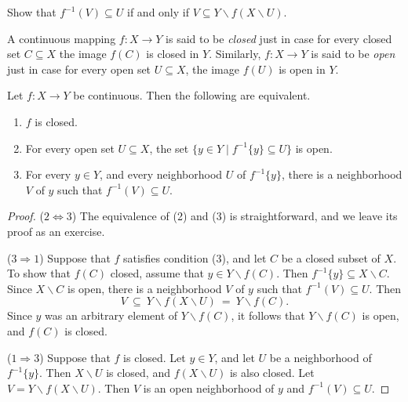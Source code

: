 \begin{exercise} Show that $f^{-1}(V)\subseteq U$ if and only if $V\subseteq
Y\backslash f(X\backslash U)$. \end{exercise}

\begin{defn} A continuous mapping $f:X\to Y$ is said to be
  \emph{closed} just in case for every closed set $C\subseteq X$ the
  image $f(C)$ is closed in $Y$.  Similarly, $f:X\to Y$ is said to be
  \emph{open} just in case for every open set $U\subseteq X$, the
  image $f(U)$ is open in $Y$. \end{defn}

\begin{prop} Let $f:X\to Y$ be continuous.  Then the following are
  equivalent.
\begin{enumerate}
\item $f$ is closed.
\item For every open set $U\subseteq X$, the set $\{ y\in Y\mid
  f^{-1}\{ y\}\subseteq U\}$ is open.
\item For every $y\in Y$, and every neighborhood $U$ of $f^{-1}\{
  y\}$, there is a neighborhood $V$ of $y$ such that
  $f^{-1}(V)\subseteq U$.
\end{enumerate}
\label{closed-map} \end{prop}


\begin{proof} ($2\Leftrightarrow 3$) The equivalence of (2) and (3) is
  straightforward, and we leave its proof as an exercise.

  \bigskip ($3\Rightarrow 1$) Suppose that $f$ satisfies condition
  (3), and let $C$ be a closed subset of $X$.  To show that $f(C)$
  closed, assume that $y\in Y\backslash f(C)$.  Then $f^{-1}\{ y\}
  \subseteq X\backslash C$.  Since $X\backslash C$ is open, there is a
  neighborhood $V$ of $y$ such that $f^{-1}(V)\subseteq U$.  Then
  \[ V \: \subseteq \: Y\backslash f(X\backslash U) \: = \:
  Y\backslash f(C) .\] Since $y$ was an arbitrary element of
  $Y\backslash f(C)$, it follows that $Y\backslash f(C)$ is open, and
  $f(C)$ is closed.

  \bigskip ($1\Rightarrow 3$) Suppose that $f$ is closed.  Let $y\in
  Y$, and let $U$ be a neighborhood of $f^{-1}\{ y\}$.  Then
  $X\backslash U$ is closed, and $f(X\backslash U)$ is also closed.
  Let $V=Y\backslash f(X\backslash U)$.  Then $V$ is an open
  neighborhood of $y$ and $f^{-1}(V)\subseteq U$. \end{proof}

